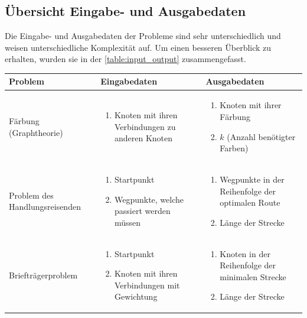 \newpage
\subsection{Übersicht Eingabe- und Ausgabedaten \resultAssignment{[R2]}}\label{overview_input_output}
Die Eingabe- und Ausgabedaten der Probleme sind sehr unterschiedlich und weisen unterschiedliche Komplexität auf. Um einen besseren Überblick zu erhalten, wurden sie in der 
\autoref{table:input_output} zusammengefasst.
\begin{table}[ht]
\centering
  \begin{tabular}{ p{3cm} | p{5.4cm} | p{5.4cm} }
	\hline
	\rowcolor{gray}
	\textbf{Problem}				& \textbf{Eingabedaten}								& \textbf{Ausgabedaten}\\ \hline
	Färbung (Graphtheorie)			& \begin{enumerate}
								\item Knoten mit ihren Verbindungen zu anderen Knoten
							   \end{enumerate}				
							&  \begin{enumerate}
								\item Knoten mit ihrer Färbung
								\item $k$ (Anzahl benötigter Farben)
							   \end{enumerate}	\\ \hline
	Problem des Handlungsreisenden		& \begin{enumerate}
								\item Startpunkt
								\item Wegpunkte, welche passiert werden müssen
							   \end{enumerate}				
							&  \begin{enumerate}
								\item Wegpunkte in der Reihenfolge der optimalen Route
								\item Länge der Strecke
							   \end{enumerate}	\\ \hline
	Briefträgerproblem	 			& \begin{enumerate}
								\item Startpunkt
								\item Knoten mit ihren Verbindungen mit Gewichtung
							   \end{enumerate}				
							&  \begin{enumerate}
								\item Knoten in der Reihenfolge der minimalen Strecke
								\item Länge der Strecke

\end{enumerate}
\end{tabular}
\end{table}
